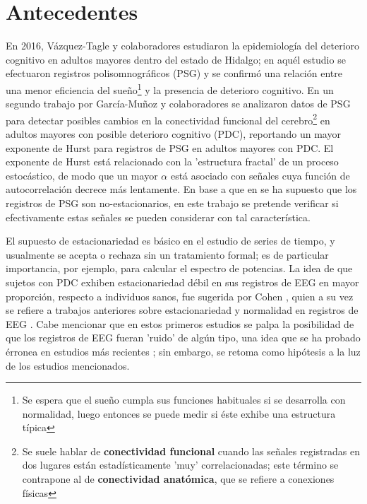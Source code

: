 \documentclass[12pt,a4paper]{mitthesis}
\begin{document}
\setcounter{page}{1}

\chapter{Antecedentes}

En 2016, V\'azquez-Tagle y colaboradores \cite{VazquezTagle16} estudiaron la epidemiolog\'ia del 
deterioro cognitivo en adultos mayores dentro del estado de Hidalgo; en aqu\'el estudio se 
efectuaron registros polisomnogr\'aficos (PSG) y se confirm\'o una relaci\'on entre una menor 
eficiencia del sue\~no\footnote{Se espera que el sue\~no cumpla sus funciones habituales si se 
desarrolla con normalidad, luego entonces se puede medir si \'este exhibe una estructura t\'ipica} 
y la presencia de deterioro cognitivo.
En un segundo trabajo por Garc\'ia-Mu\~noz y colaboradores \cite{Valeria} se analizaron datos de 
PSG para detectar posibles cambios en la conectividad funcional del cerebro\footnote{Se suele 
hablar de \textbf{conectividad funcional} cuando las se\~nales registradas en dos lugares est\'an 
estad\'isticamente 'muy' correlacionadas; este t\'ermino se contrapone al de \textbf{conectividad 
anat\'omica}, que se refiere a conexiones f\'isicas} en adultos mayores con posible deterioro 
cognitivo (PDC), reportando un mayor exponente de Hurst para registros de PSG en adultos mayores 
con PDC.
El exponente de Hurst est\'a relacionado con la 'estructura fractal' de un proceso estoc\'astico,
de modo que un mayor $\alpha$ est\'a asociado con se\~nales cuya funci\'on de autocorrelaci\'on 
decrece m\'as lentamente.
En base a que en \cite{Valeria} se ha supuesto que los registros de PSG son no-estacionarios, en 
este trabajo se pretende verificar si efectivamente estas se\~nales se pueden considerar con tal
caracter\'istica.

El supuesto de estacionariedad es b\'asico en el estudio de series de tiempo, y usualmente se 
acepta o rechaza sin un tratamiento formal; es de particular importancia, por ejemplo, para 
calcular el espectro de potencias.
La idea de que sujetos con PDC exhiben estacionariedad d\'ebil en sus registros de EEG en mayor 
proporci\'on, respecto a individuos sanos, fue sugerida por Cohen \cite{Cohen77}, quien a su vez se 
refiere a trabajos anteriores sobre estacionariedad y normalidad en registros de EEG 
\cite{McEwen75,Sugimoto78,Kawabata73}.
Cabe mencionar que en estos primeros estudios se palpa la posibilidad de que los registros de EEG 
fueran 'ruido' de alg\'un tipo, una idea que se ha probado \'erronea en estudios m\'as recientes 
\cite{Klonowski09}; sin embargo, se retoma como hip\'otesis a la luz de los estudios mencionados. 
\end{document}
